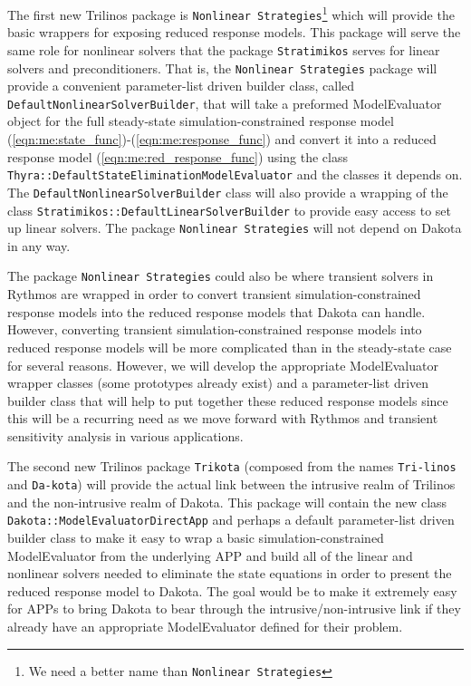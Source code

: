 \documentclass[pdf,ps2pdf,11pt]{SANDreport}
\begin{document}
The first new Trilinos package is {}\texttt{Nonlinear Strategies}\footnote{We
need a better name than {}\texttt{Nonlinear Strategies}} which will provide
the basic wrappers for exposing reduced response models.  This package will
serve the same role for nonlinear solvers that the package
{}\texttt{Stratimikos} serves for linear solvers and preconditioners.  That
is, the {}\texttt{Nonlinear Strategies} package will provide a convenient
parameter-list driven builder class, called
{}\texttt{Default\-Nonlinear\-Solver\-Builder}, that will take a preformed
ModelEvaluator object for the full steady-state simulation-constrained
response model (\ref{eqn:me:state_func})-(\ref{eqn:me:response_func}) and
convert it into a reduced response model (\ref{eqn:me:red_response_func})
using the class
{}\texttt{Thyra\-::Default\-State\-Elimination\-Model\-Evaluator} and the
classes it depends on.  The {}\texttt{Default\-Nonlinear\-Solver\-Builder}
class will also provide a wrapping of the class
{}\texttt{Stratimikos\-::Default\-Linear\-Solver\-Builder} to provide easy
access to set up linear solvers.  The package {}\texttt{Nonlinear Strategies}
will not depend on Dakota in any way.

The package {}\texttt{Nonlinear Strategies} could also be where transient
solvers in Rythmos are wrapped in order to convert transient
simulation-constrained response models into the reduced response models that
Dakota can handle.  However, converting transient simulation-constrained
response models into reduced response models will be more complicated than in
the steady-state case for several reasons.  However, we will develop the
appropriate ModelEvaluator wrapper classes (some prototypes already exist) and
a parameter-list driven builder class that will help to put together these
reduced response models since this will be a recurring need as we move forward
with Rythmos and transient sensitivity analysis in various applications.

The second new Trilinos package {}\texttt{Trikota} (composed from the names
{}\texttt{Tri-linos} and {}\texttt{Da-kota}) will provide the actual link
between the intrusive realm of Trilinos and the non-intrusive realm of Dakota.
This package will contain the new class
{}\texttt{Dakota::\-Model\-Evaluator\-Direct\-App} and perhaps a default
parameter-list driven builder class to make it easy to wrap a basic
simulation-constrained ModelEvaluator from the underlying APP and build all of
the linear and nonlinear solvers needed to eliminate the state equations in
order to present the reduced response model to Dakota.  The goal would be to
make it extremely easy for APPs to bring Dakota to bear through the
intrusive/non-intrusive link if they already have an appropriate
ModelEvaluator defined for their problem.
\end{document}
